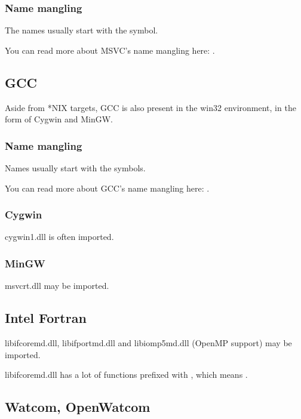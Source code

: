 \subsubsection{Name mangling}

The names usually start with the  symbol.

You can read more about MSVC's \gls{name mangling} here: .

\subsection{GCC}

Aside from *NIX targets, GCC is also present in the win32 environment, in the form of Cygwin and MinGW.

\subsubsection{Name mangling}

Names usually start with the  symbols.

You can read more about GCC's \gls{name mangling} here: .

\subsubsection{Cygwin}

cygwin1.dll is often imported.

\subsubsection{MinGW}

msvcrt.dll may be imported.

\subsection{Intel Fortran}

libifcoremd.dll, libifportmd.dll and libiomp5md.dll (OpenMP support) may be imported.

libifcoremd.dll has a lot of functions prefixed with , which means .

\subsection{Watcom, OpenWatcom}

